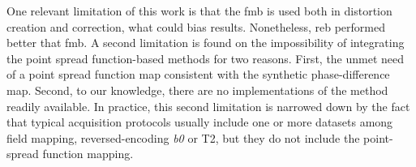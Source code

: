 One relevant limitation of this work is that the \gls*{fmb} is
used both in distortion creation and correction, what could
bias results. Nonetheless, \gls*{reb} performed better that \gls*{fmb}.
A second limitation is found on the impossibility of integrating the
point spread function-based methods for two reasons.
First, the unmet need of a point spread function map consistent
with the synthetic phase-difference map. Second, to our knowledge,
there are no implementations of the method readily available.
In practice, this second limitation is narrowed down by the
fact that typical acquisition protocols usually include one or more
datasets among field mapping, reversed-encoding \textit{b0} or T2,
but they do not include the point-spread function mapping.